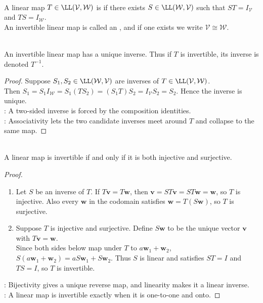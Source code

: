 \begin{definition} \\
A linear map $T \in \LL(\mathcal{V}, \mathcal{W})$ is  if there exists $S \in \LL(\mathcal{W}, \mathcal{V})$ such that $ST = I_{\mathcal{V}}$ and $TS = I_{\mathcal{W}}$.\\
An invertible linear map is called an , and if one exists we write $\mathcal{V} \cong \mathcal{W}$.
\end{definition}

\begin{proposition} \label{prop:inverse-linear-map-is-unique} \\
An invertible linear map has a unique inverse. Thus if $T$ is invertible, its inverse is denoted $T^{-1}$.
\begin{proof}
Suppose $S_1,S_2\in\LL(\mathcal{W},\mathcal{V})$ are inverses of $T\in\LL(\mathcal{V},\mathcal{W})$.\\
Then $S_1 = S_1I_{\mathcal{W}} = S_1(TS_2) = (S_1T)S_2 = I_{\mathcal{V}}S_2 = S_2$. Hence the inverse is unique.\\
: A two-sided inverse is forced by the composition identities.\\
: Associativity lets the two candidate inverses meet around $T$ and collapse to the same map.
\end{proof}
\end{proposition}

\begin{proposition} \label{prop:linear-map-invertible-iff-bijective} \\
A linear map is invertible if and only if it is both injective and surjective.
\begin{proof}
\begin{enumerate}[label=\roman*.]
\setlength{\itemsep}{0pt}
\item[$(\Rightarrow)$] Let $S$ be an inverse of $T$. If $T\mathbf{v}=T\mathbf{w}$, then $\mathbf{v}=ST\mathbf{v}=ST\mathbf{w}=\mathbf{w}$, so $T$ is injective. Also every $\mathbf{w}$ in the codomain satisfies $\mathbf{w}=T(S\mathbf{w})$, so $T$ is surjective.
\item[$(\Leftarrow)$] Suppose $T$ is injective and surjective. Define $S\mathbf{w}$ to be the unique vector $\mathbf{v}$ with $T\mathbf{v}=\mathbf{w}$.\\
Since both sides below map under $T$ to $a\mathbf{w}_1+\mathbf{w}_2$, $S(a\mathbf{w}_1+\mathbf{w}_2)=aS\mathbf{w}_1+S\mathbf{w}_2$. Thus $S$ is linear and satisfies $ST=I$ and $TS=I$, so $T$ is invertible.
\end{enumerate}
: Bijectivity gives a unique reverse map, and linearity makes it a linear inverse.\\
: A linear map is invertible exactly when it is one-to-one and onto.
\end{proof}
\end{proposition}

